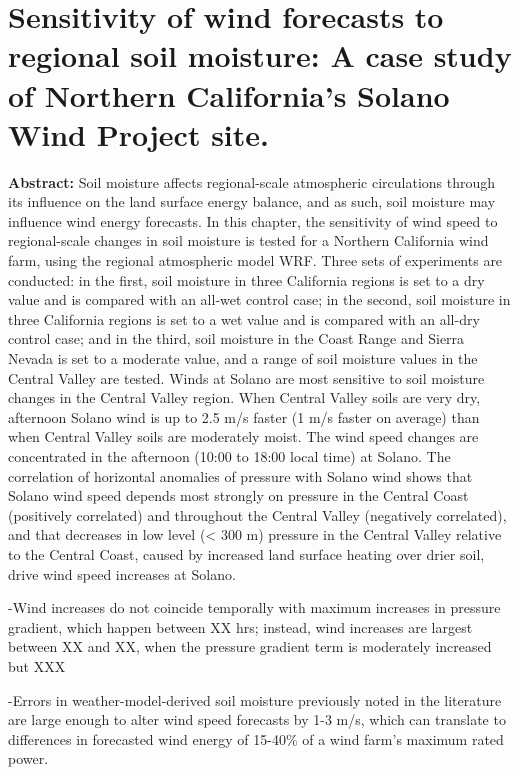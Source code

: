 \chapter{Sensitivity of wind forecasts to regional soil moisture: A case study of Northern California's Solano Wind Project site.}
\label{c.wind}

\textbf{Abstract:}  Soil moisture affects regional-scale atmospheric circulations through its influence on the land surface energy balance, and as such, soil moisture may influence wind energy forecasts.  In this chapter, the sensitivity of wind speed to regional-scale changes in soil moisture is tested for a Northern California wind farm, using the regional atmospheric model WRF.  Three sets of experiments are conducted: in the first, soil moisture in three California regions is set to a dry value and is compared with an all-wet control case; in the second, soil moisture in three California regions is set to a wet value and is compared with an all-dry control case; and in the third, soil moisture in the Coast Range and Sierra Nevada is set to a moderate value, and a range of soil moisture values in the Central Valley are tested.  Winds at Solano are most sensitive to soil moisture changes in the Central Valley region.  When Central Valley soils are very dry, afternoon Solano wind is up to 2.5 m/s faster (1 m/s faster on average) than when Central Valley soils are moderately moist.  The wind speed changes are concentrated in the afternoon (10:00 to 18:00 local time) at Solano.  The correlation of horizontal anomalies of pressure with Solano wind shows that Solano wind speed depends most strongly on pressure in the Central Coast (positively correlated) and throughout the Central Valley (negatively correlated), and that decreases in low level (< 300 m) pressure in the Central Valley relative to the Central Coast, caused by increased land surface heating over drier soil, drive wind speed increases at Solano. 

-Wind increases do not coincide temporally with maximum increases in pressure gradient, which happen between XX hrs; instead, wind increases are largest between XX and XX, when the pressure gradient term is moderately increased but XXX

-Errors in weather-model-derived soil moisture previously noted in the literature are large enough to alter wind speed forecasts by 1-3 m/s, which can translate to differences in forecasted wind energy of 15-40\% of a wind farm's maximum rated power.









